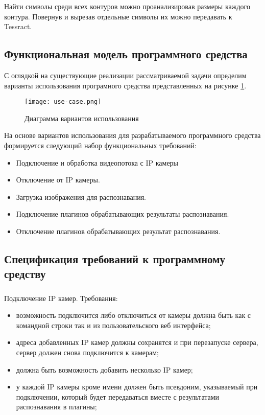 Найти символы среди всех контуров можно проанализировав размеры каждого контура. Повернув и вырезав отдельные символы их можно передавать к Tessract. 

\subsection{Функциональная модель программного средства}
\label{sec:funcreq:funcmodel}

С оглядкой на существующие реализации рассматриваемой задачи определим варианты использования програмного средства представленных на рисунке \ref{fig:funcreq:funcmodel}.

\begin{figure}[ht]
\centering
    \texttt{[image: use-case.png]}  
    \caption{Диаграмма вариантов использования}
  \label{fig:funcreq:funcmodel}
\end{figure}

На основе вариантов использования для разрабатываемого программного средства формируется следующий набор функциональных требований:
\begin{itemize}
	\item Подключение и обработка видеопотока с IP камеры
	\item Отключение от IP камеры.
	\item Загрузка изображения для распознавания.
	\item Подключение плагинов обрабатывающих результаты распознавания.
	\item Отключение плагинов обрабатывающих результат распознавания.
\end{itemize}

\subsection{Спецификация требований к программному средству}
\label{sec:fucreq:specification}

\subsubsection{}
Подключение IP камер. Требования:
\begin{itemize}
	\item возможность подключится либо отключиться от камеры должна быть как с командной строки так и из пользовательского веб интерфейса;
	\item адреса добавленных IP камер должны сохранятся и при перезапуске сервера, сервер должен снова подключится к камерам;
	\item должна быть возможность добавить несколько IP камер;
	\item у каждой IP камеры кроме имени должен быть псевдоним, указываемый при подключении, который будет передаваться вместе с результатами распознавания в плагины;
\end{itemize}

